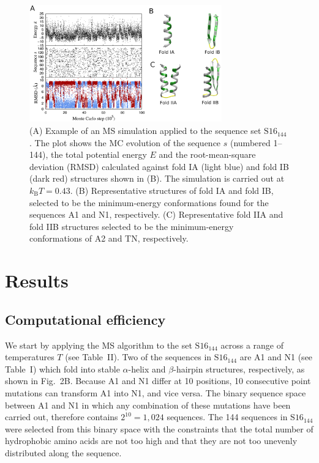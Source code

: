 \documentclass[
aip,
rsi,%
amsmath,amssymb,
reprint,%
]{revtex4-1}
\newcommand	 {\sbar}	{{s}}
\newcommand	 {\kb}		{{k_\mathrm{B}}}
\newcommand {\SR}		{${\mathrm{S16}_{144}}$}
\begin{document}
\begin{figure}
\includegraphics[width=8.3cm]{Fig2}
\caption{(A) Example of an MS simulation applied to the sequence set $\mathrm{S16}_{144}$. The plot shows the MC evolution of the sequence $\sbar$ (numbered 1--144), the total potential energy $E$ and the root-mean-square deviation (RMSD) calculated against fold IA (light blue) and fold IB (dark red) structures shown in (B). The simulation is carried out at $\kb T = 0.43$. (B) Representative structures of fold IA and fold IB, selected to be the minimum-energy conformations found for the sequences A1 and N1, respectively. (C) Representative fold IIA and fold IIB structures selected to be the minimum-energy conformations of A2 and TN, respectively. }
\end{figure}

\section{Results}

\subsection{Computational efficiency}
\noindent
We start by applying the MS algorithm to the set {\SR} across a range of temperatures $T$ (see Table~II). Two of the sequences in {\SR} are A1 and N1 (see Table~I) which fold into stable $\alpha$-helix and $\beta$-hairpin structures, respectively, as shown in Fig.~2B. Because A1 and N1 differ at 10 positions, 10 consecutive point mutations can transform A1 into N1, and vice versa. The binary sequence space between A1 and N1 in which any combination of these mutations have been carried out, therefore contains $2^{10}=1,024$ sequences. The 144 sequences in {\SR} were selected from this binary space with the constraints that the total number of hydrophobic amino acids are not too high and that they are not too unevenly distributed along the sequence.~\cite{Holzgrafe2014}
\end{document}
